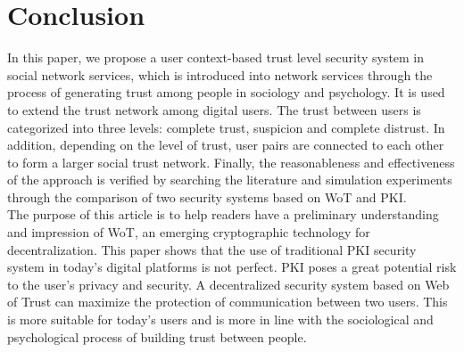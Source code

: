 \section{Conclusion}
In this paper, we propose a user context-based trust level security system in social 
network services, which is introduced into network services through the process of 
generating trust among people in sociology and psychology. It is used to extend the 
trust network among digital users\cite{b22}. The trust between users is categorized into three 
levels: complete trust, suspicion and complete distrust\cite{b10, b14}. In addition, depending on the level 
of trust, user pairs are connected to each other to form a larger social trust network\cite{b20}. 
Finally, the reasonableness and effectiveness of the approach is verified by searching 
the literature and simulation experiments through the comparison of two security systems 
based on WoT and PKI\cite{b15, b16}.
\\
The purpose of this article is to help readers have a preliminary understanding and 
impression of WoT, an emerging cryptographic technology for decentralization\cite{b19}. This 
paper shows that the use of traditional PKI security system in today's digital platforms 
is not perfect. PKI poses a great potential risk to the user's privacy and security\cite{b21}. 
A decentralized security system based on Web of Trust can maximize the protection of 
communication between two users. This is more suitable for today's users and is more 
in line with the sociological and psychological process of building trust between people\cite{b24}.